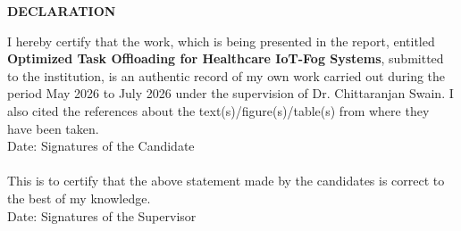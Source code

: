 \newpage
\begin{center}
{\large \bf DECLARATION}
\end{center}
I hereby certify that the work, which is being presented in the report, entitled \textbf{Optimized Task Offloading for Healthcare IoT-Fog Systems}, submitted to the institution, is an authentic record of my own work carried out during the period May 2026 to July 2026 under the supervision of Dr. Chittaranjan Swain. I also cited the references about the text(s)/figure(s)/table(s) from where they have been taken.
\vspace{0.6in} \\
Date: \hspace{3.2in} Signatures of the Candidate \\
\vspace{0.4in} \\
This is to certify that the above statement made by the candidates is correct to the best
 of my knowledge.
 \vspace{0.8in} \\
 Date: \hspace{3.2in} Signatures of the Supervisor \\